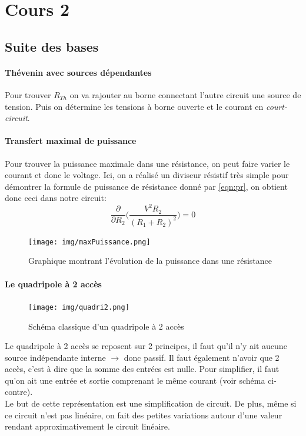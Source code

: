 \documentclass{report}
\begin{document}
\chapter{Cours 2}
\section{Suite des bases}
\subsubsection{Thévenin avec sources dépendantes}
Pour trouver $R_{Th}$ on va rajouter au borne connectant l'autre circuit une source de tension. Puis on détermine les tensions à borne ouverte et le courant en \textit{court-circuit}.

\subsubsection{Transfert maximal de puissance}
Pour trouver la puissance maximale dans une résistance, on peut faire varier le courant et donc le voltage. Ici, on a réalisé un diviseur résistif très simple pour démontrer la formule de puissance de résistance donné par \ref{eqn:pr}, on obtient donc ceci dans notre circuit:
\begin{equation}
\frac{\partial}{\partial R_2} \biggl(\frac{V^2 R_2}{(R_1 + R_2)^2}\biggl) = 0
\end{equation}

\begin{figure}[H]
\centering
\texttt{[image: img/maxPuissance.png]}
\caption{Graphique montrant l'évolution de la puissance dans une résistance}
\end{figure}

\subsubsection{Le quadripole à 2 accès}
\begin{figure}
\centering
\texttt{[image: img/quadri2.png]}
\caption{Schéma classique d'un quadripole à 2 accès}
\end{figure}
Le quadripole à 2 accès se reposent sur 2 principes, il faut qu'il n'y ait aucune source indépendante interne $\rightarrow$ donc passif. Il faut également n'avoir que 2 accès, c'est à dire que la somme des entrées est nulle. Pour simplifier, il faut qu'on ait une entrée et sortie comprenant le même courant (voir schéma ci-contre).\\
Le but de cette représentation est une simplification de circuit. De plus, même si ce circuit n'est pas linéaire, on fait des petites variations autour d'une valeur rendant approximativement le circuit linéaire.\\
\end{document}
